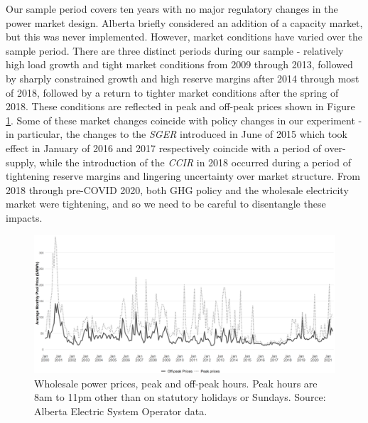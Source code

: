 \documentclass[12pt]{article}
\begin{document}
Our sample period covers ten years with no major regulatory changes in the power market design. Alberta briefly considered an addition of a capacity market, but this was never implemented. However, market conditions have varied over the sample period. There are three distinct periods during our sample - relatively high load growth and tight market conditions from 2009 through 2013, followed by sharply constrained growth and high reserve margins after 2014 through most of 2018, followed by a return to tighter market conditions after the spring of 2018. These conditions are reflected in peak and off-peak prices shown in Figure \ref{fig:ab_prices}. Some of these market changes coincide with policy changes in our experiment - in particular, the changes to the \emph{SGER} introduced in June of 2015 which took effect in January of 2016 and 2017 respectively coincide with a period of over-supply, while the introduction of the \emph{CCIR} in 2018 occurred during a period of tightening reserve margins and lingering uncertainty over market structure. From 2018 through pre-COVID 2020, both GHG policy and the wholesale electricity market were tightening, and so we need to be careful to disentangle these impacts.

\begin{figure}[t]%
	\centering \vspace{-.25cm} \includegraphics[width=6.5in]{../images/peak_prices.png}
\vspace{-0.75cm}	\caption{Wholesale power prices, peak and off-peak hours. Peak hours are 8am to 11pm other than on statutory holidays or Sundays. Source: Alberta Electric System Operator data.}
\label{fig:ab_prices}
\end{figure}
\end{document}
